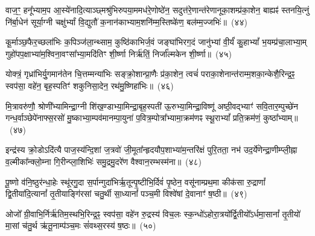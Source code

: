 {\anuvakamend[{स्ते॒गान्द्वाविꣳ॑शतिः}]}%

वाज॒ꣳ॒ हनू᳚भ्याम॒प आ॒स्ये॑नादि॒त्याञ्छ्मश्रु॑भिरुपया॒ममध॑रे॒णोष्ठे॑न॒ सदुत्त॑रे॒णान्त॑रेणानूका॒शम्प्र॑का॒शेन॒ बाह्यꣴ॑ स्तनयि॒त्नुं नि॑र्बा॒धेन॑ सूर्या॒ग्नी चक्षु॑र्भ्यां वि॒द्युतौ॑ क॒नान॑काभ्याम॒शनि॑म्म॒स्तिष्के॑ण॒ बल॑म्म॒ज्जभिः॑॥~(४४)

{\anuvakamend[{वाजं॒ पञ्च॑विꣳशतिः}]}%

कू॒र्माञ्छ॒फैर॒च्छला॑भिः क॒पिञ्ज॑ला॒न्थ्साम॒ कुष्ठि॑काभिर्ज॒वं जङ्घा॑भिरग॒दं जानु॑भ्यां वी॒र्यं॑ कु॒हा\-भ्यां᳚ भ॒यम्प्र॑चा॒लाभ्या॒म् गुहो॑पप॒क्षाभ्या॑म॒श्विना॒वꣳसा᳚भ्या॒मदि॑तिꣳ शी॒र्ष्णा निर्\mbox{}ऋ॑तिं॒ निर्जा᳚ल्मकेन शी॒र्ष्णा॥~(४५)

{\anuvakamend[{कू॒र्मान्त्रयो॑विꣳशतिः}]}%

योक्त्रं॒ गृध्रा॑भिर्यु॒गमान॑तेन चि॒त्तम्मन्या॑भिः सङ्क्रो॒शान्प्रा॒णैः प्र॑का॒शेन॒ त्वचं॑ पराका॒शेनान्त॑राम्म॒शका॒न्केशै॒रिन्द्र॒ꣴ॒ स्वप॑सा॒ वहे॑न॒ बृह॒स्पतिꣳ॑ शकुनिसा॒देन॒ रथ॑मु॒ष्णिहा॑भिः॥~(४६)

{\anuvakamend[{योक्त्र॒मेक॑विꣳशतिः}]}%

मि॒त्रावरु॑णौ॒ श्रोणी᳚भ्यामिन्द्रा॒ग्नी शि॑ख॒ण्डाभ्या॒मिन्द्रा॒बृह॒स्पती॑ ऊ॒रुभ्या॒मिन्द्रा॒विष्णू॑ अष्ठी॒वद्भ्याꣳ॑ सवि॒तार॒म्पुच्छे॑न गन्ध॒र्वाञ्छेपे॑नाफ्स॒रसो॑ मु॒ष्काभ्या॒म्पव॑मानम्पा॒युना॑ प॒वित्र॒म्पोत्रा᳚भ्यामा॒क्रम॑णꣴ स्थू॒रा\-भ्यां᳚ प्रति॒क्रम॑णं॒ कुष्ठा᳚भ्याम्॥~(४७)

{\anuvakamend[{}]}%

इन्द्र॑स्य क्रो॒डो\-ऽदि॑त्यै पाज॒स्य॑न्दि॒शां ज॒त्रवो॑ जी॒मूता᳚न्हृदयौप॒शाभ्या॑म॒न्तरि॑क्षं पुरि॒तता॒ नभ॑ उद॒र्ये॑णेन्द्रा॒णीम्प्ली॒ह्ना व॒ल्मीका᳚न्क्लो॒म्ना गि॒रीन्प्ला॒शिभिः॑ समु॒द्रमु॒दरे॑ण वैश्वान॒रम्भस्म॑ना॥~(४८)

{\anuvakamend[{मि॒त्रावरु॑णा॒विन्द्र॑स्य॒ द्वाविꣳ॑शति॒र्द्वाविꣳ॑शतिः}]}%

पू॒ष्णो व॑नि॒ष्ठुर॑न्धा॒हेः स्थू॑रगु॒दा स॒र्पान्गुदा॑भिर्\mbox{}ऋ॒तून्पृ॒ष्टीभि॒र्दिवं॑ पृ॒ष्ठेन॒ वसू॑नाम्प्रथ॒मा कीक॑सा रु॒द्राणां᳚ द्वि॒तीया॑दि॒त्यानां᳚ तृ॒तीयाङ्गि॑रसां चतु॒र्थी सा॒ध्यानां᳚ पञ्च॒मी विश्वे॑षां दे॒वानाꣳ॑ ष॒ष्ठी॥~(४९)

{\anuvakamend[{पू॒ष्णश्चतु॑र्विꣳशतिः}]}%

ओजो᳚ ग्री॒वाभि॒र्निर्\mbox{}ऋ॑तिम॒स्थभि॒रिन्द्र॒ꣴ॒ स्वप॑सा॒ वहे॑न रु॒द्रस्य॑ विच॒लः स्क॒न्धो॑\-ऽहोरा॒त्रयो᳚र्द्वि॒तीयो᳚\-ऽर्धमा॒सानां᳚ तृ॒तीयो॑ मा॒सां च॑तु॒र्थ ऋ॑तू॒नाम्प॑ञ्च॒मः सं॑वथ्स॒रस्य॑ ष॒ष्ठः॥~(५०)

